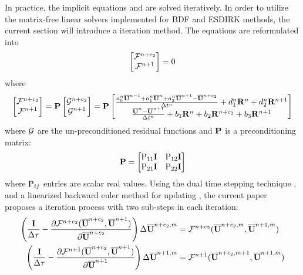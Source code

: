 In practice, the implicit equations 
and  are solved iteratively. 
In order to utilize the matrix-free linear 
solvers implemented for BDF and ESDIRK methods,
the current section will introduce a iteration
method. The equations are reformulated into
\begin{equation}
    \begin{bmatrix}
        \mathcal{F}^{n+c_2} \\
        \mathcal{F}^{n+1}
    \end{bmatrix} = 0
\end{equation}
where
\begin{equation}
    \begin{aligned}
        \begin{bmatrix}
            \mathcal{F}^{n+c_2} \\
            \mathcal{F}^{n+1}
        \end{bmatrix} = \mathbf{P}\begin{bmatrix}
            \mathcal{G}^{n+c_2} \\
            \mathcal{G}^{n+1}
        \end{bmatrix}  = \mathbf{P}\begin{bmatrix}
            \frac{a^n_0\overline{\mathbf{U}}^{n - 1} +
                a^n_1\overline{\mathbf{U}}^{n} +
                a^n_2\overline{\mathbf{U}}^{n + 1} - \overline{\mathbf{U}}^{n+c_2}}{\mathrm\Delta t^n}
            +
            d^n_1\mathbf{R}^{n} +
            d^n_2\mathbf{R}^{n + 1}
            \\
            \frac{\overline{\mathbf{U}}^{n} - \overline{\mathbf{U}}^{n+1}}{\mathrm\Delta t^n}  +
            b_1 \mathbf{R}^n +
            b_2 \mathbf{R}^{n+c_2} +
            b_3 \mathbf{R}^{n+1}
        \end{bmatrix}
        \label{eq:DITRFFDef}
    \end{aligned}
\end{equation}
where $\mathcal{G}$ are the un-preconditioned residual functions 
and $\mathbf{P}$ is a preconditioning matrix:
\begin{equation}
    \mathbf{P} = \begin{bmatrix}
        \mathrm{P}_{11}\mathbf{I} & \mathrm{P}_{12}\mathbf{I} \\
        \mathrm{P}_{21}\mathbf{I} & \mathrm{P}_{22}\mathbf{I} \\
        \end{bmatrix}
\end{equation}
where $\mathrm{P}_{ij}$ entries are scalar real values. 
Using the dual time stepping technique \cite{jameson1991time},
and a linearized backward euler method for updating \cite{luo1998fast},
the current paper proposes a iteration process with two sub-steps in each iteration:
\begin{equation}
    \begin{aligned}
        \left(\frac{\eye}{\inc\tau} -
        \partialderivative{\FF^{n+c_2}(\uu^{n+c_2}, \uu^{n+1})}{\uu^{n+c_2}}  \right)
        \inc\uu^{n+c_2,m} & = \FF^{n+c_2}(\uu^{n+c_2,m}, \uu^{n+1,m}) \\
        \left(\frac{\eye}{\inc\tau} -
        \partialderivative{\FF^{n+1}(\uu^{n+c_2}, \uu^{n+1})}{\uu^{n+1}}  \right)
        \inc\uu^{n+1,m}   & = \FF^{n+1}(\uu^{n+c_2,m+1}, \uu^{n+1,m}) \\
    \end{aligned}
    \label{eq:DITRSDS}
\end{equation}
